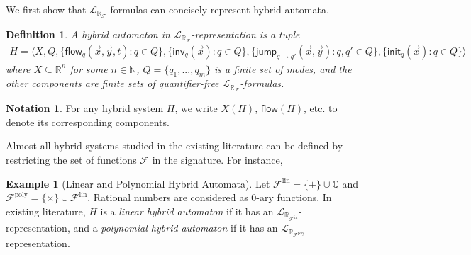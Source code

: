 \documentclass[10pt]{article}
\theoremstyle{plain}
\newtheorem{definition}[theorem]{Definition}
\theoremstyle{definition}
\newtheorem{example}[theorem]{Example}
\newtheorem{notation}[theorem]{Notation}
\newcommand{\flow}{\mathsf{flow}}
\newcommand{\jump}{\mathsf{jump}}
\newcommand{\inv}{\mathsf{inv}}
\newcommand{\init}{\mathsf{init}}
\newcommand{\lrf}{\mathcal{L}_{\mathbb{R}_{\mathcal{F}}}}
\begin{document}
We first show that $\lrf$-formulas can concisely represent hybrid automata.
\begin{definition}\label{lrf-definition}
A hybrid automaton in $\lrf$-representation is a tuple
\begin{multline*}
H = \langle X, Q, \{{\flow}_q(\vec x, \vec y, t): q\in Q\},\{\inv_q(\vec x): q\in Q\},
\{\jump_{q\rightarrow q'}(\vec x, \vec y): q,q'\in Q\},\{\init_q(\vec x): q\in Q\}\rangle
\end{multline*}
where $X\subseteq \mathbb{R}^n$ for some $n\in \mathbb{N}$, $Q=\{q_1,...,q_m\}$ is a finite set of modes, and the other components are finite sets of quantifier-free $\lrf$-formulas.
\end{definition}
\begin{notation}
For any hybrid system $H$, we write $X(H)$, $\flow(H)$, etc. to denote its corresponding components.
\end{notation}
Almost all hybrid systems studied in the existing literature can be defined by restricting the set of functions $\mathcal{F}$ in the signature. For instance,
\begin{example}[Linear and Polynomial Hybrid Automata] Let $\mathcal{F}^{\mathrm{lin}} = \{+\}\cup \mathbb{Q}$ and $\mathcal{F}^{\mathrm{poly}}=\{\times\}\cup\mathcal{F}^{\mathrm{lin}}$. Rational numbers are considered as 0-ary functions. In existing literature, $H$ is a {\em linear hybrid automaton} if it has an $\mathcal{L}_{\mathbb{R}_{\mathcal{F}^{\mathrm{lin}}}}$-representation, and a {\em polynomial hybrid automaton} if it has an $\mathcal{L}_{\mathbb{R}_{\mathcal{F}^{\mathrm{poly}}}}$-representation.
\end{example}
\end{document}
